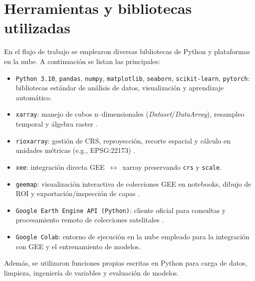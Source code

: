 \section{Herramientas y bibliotecas utilizadas}

En el flujo de trabajo se emplearon diversas bibliotecas de Python y plataformas en la nube. 
A continuación se listan las principales:

\begin{itemize}
    \item \texttt{Python 3.10}, \texttt{pandas}, \texttt{numpy}, \texttt{matplotlib}, \texttt{seaborn}, \texttt{scikit-learn}, \texttt{pytorch}: bibliotecas estándar de análisis de datos, visualización y aprendizaje automático.
    \item \texttt{xarray}: manejo de cubos n–dimensionales (\textit{Dataset}/\textit{DataArray}), resampleo temporal y álgebra raster \parencite{xarray2020}.
    \item \texttt{rioxarray}: gestión de CRS, reproyección, recorte espacial y cálculo en unidades métricas (e.g., EPSG:22173) \parencite{rioxarray}.
    \item \texttt{xee}: integración directa GEE~$\leftrightarrow$~xarray preservando \texttt{crs} y \texttt{scale}.
    \item \texttt{geemap}: visualización interactiva de colecciones GEE en notebooks, dibujo de ROI y exportación/inspección de capas \parencite{geemap2021}.
    \item \texttt{Google Earth Engine API (Python)}: cliente oficial para consultas y procesamiento remoto de colecciones satelitales \parencite{gorelick2017gee}.
    \item \texttt{Google Colab}: entorno de ejecución en la nube empleado para la integración con GEE y el entrenamiento de modelos.
\end{itemize}

Además, se utilizaron funciones propias escritas en Python para carga de datos, limpieza, ingeniería de variables y evaluación de modelos.




